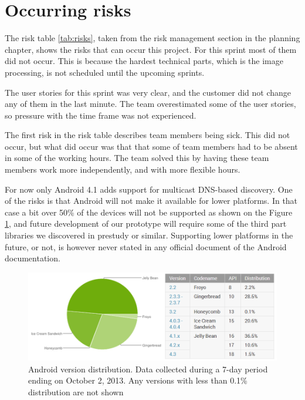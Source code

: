 \section{Occurring risks}
The risk table \ref{tab:risks}, taken from the risk management section in the planning chapter, shows the risks that can occur this project. 
For this sprint most of them did not occur. 
This is because the hardest technical parts, which is the image processing, is not scheduled until the upcoming sprints. 

The user stories for this sprint was very clear, and the customer did not change any of them in the last minute. The team overestimated some of the user stories, so pressure with the time frame was not experienced.

The first risk in the risk table describes team members being sick. This did not occur, but what did occur was that that some of team members had to be absent in some of the working hours. 
The team solved this by having these team members work more independently, and with more flexible hours.  

For now only Android 4.1 adds support for multicast DNS-based discovery.
One of the risks is that Android will not make it available for lower platforms.
In that case a bit over 50\% of the devices will not be supported as shown on the Figure \ref{fig:Platform_chart }, and future development of our prototype will require some of the third part libraries we discovered in prestudy or similar.
Supporting lower platforms in the future, or not, is however never stated in any official document of the Android documentation.

\begin{figure}[H]
	\centering
		\includegraphics[width=16cm]{sprint1/android_platform_chart.png}
	\caption[Android version distribution]{Android version distribution\footnotemark. Data collected during a 7-day period ending on October 2, 2013. 
	Any versions with less than 0.1\% distribution are not shown}
	\label{fig:Platform_chart }
\end{figure}

